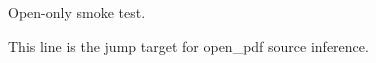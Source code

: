 \documentclass{article}
\begin{document}
Open-only smoke test.

This line is the jump target for open\_pdf source inference.
\end{document}
